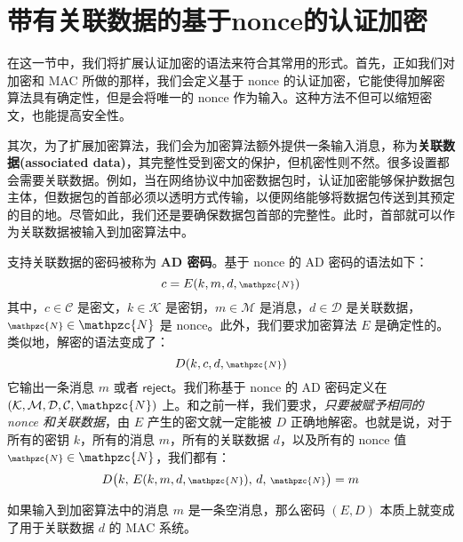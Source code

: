 \section{带有关联数据的基于nonce的认证加密}\label{sec:9-5}

在这一节中，我们将扩展认证加密的语法来符合其常用的形式。首先，正如我们对加密和 MAC 所做的那样，我们会定义基于 nonce 的认证加密，它能使得加解密算法具有确定性，但是会将唯一的 nonce 作为输入。这种方法不但可以缩短密文，也能提高安全性。

其次，为了扩展加密算法，我们会为加密算法额外提供一条输入消息，称为\textbf{关联数据(associated data)}，其完整性受到密文的保护，但机密性则不然。很多设置都会需要关联数据。例如，当在网络协议中加密数据包时，认证加密能够保护数据包主体，但数据包的首部必须以透明方式传输，以便网络能够将数据包传送到其预定的目的地。尽管如此，我们还是要确保数据包首部的完整性。此时，首部就可以作为关联数据被输入到加密算法中。

支持关联数据的密码被称为 \textbf{AD 密码}。基于 nonce 的 AD 密码的语法如下：
\[
c=E(k,m,d,{\scriptstyle\mathpzc{N}})
\]
其中，$c\in\mathcal{C}$ 是密文，$k\in\mathcal{K}$ 是密钥，$m\in\mathcal{M}$ 是消息，$d\in\mathcal{D}$ 是关联数据，${\scriptstyle\mathpzc{N}}\in\mathpzc{N}$ 是 nonce。此外，我们要求加密算法 $E$ 是确定性的。类似地，解密的语法变成了：
\[
D(k,c,d,{\scriptstyle\mathpzc{N}})
\]
它输出一条消息 $m$ 或者 $\mathsf{reject}$。我们称基于 nonce 的 AD 密码定义在 $(\mathcal{K},\mathcal{M},\mathcal{D},\mathcal{C},\mathpzc{N})$ 上。和之前一样，我们要求，\emph{只要被赋予相同的 nonce 和关联数据}，由 $E$ 产生的密文就一定能被 $D$ 正确地解密。也就是说，对于所有的密钥 $k$，所有的消息 $m$，所有的关联数据 $d$，以及所有的 nonce 值 ${\scriptstyle\mathpzc{N}}\in\mathpzc{N}$，我们都有：
\[
D\big(k,\,E(k,m,d,{\scriptstyle\mathpzc{N}}),\,d,\,{\scriptstyle\mathpzc{N}}\big)=m
\]

如果输入到加密算法中的消息 $m$ 是一条空消息，那么密码 $(E,D)$ 本质上就变成了用于关联数据 $d$ 的 MAC 系统。

